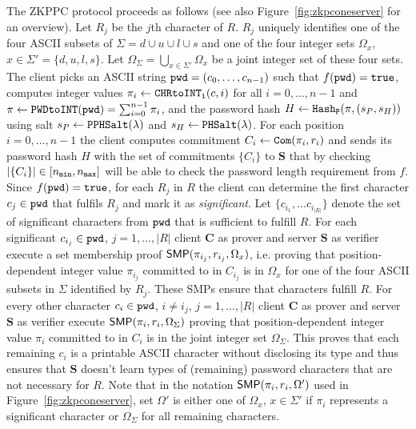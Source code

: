 The ZKPPC protocol proceeds as follows (see also Figure~\ref{fig:zkpconeserver} for an overview). Let $R_j$ be the $j$th character of $R$. $R_j$ uniquely identifies one of the four ASCII subsets of $\Sigma = d \cup u \cup l \cup s$ and one of the four integer sets $\Omega_x$, $x\in\Sigma'=\{d, u, l, s\}$. Let $\Omega_\Sigma=\bigcup_{x\in\Sigma'}\Omega_x$ be a joint integer set of these four sets. The client picks an ASCII string $\mathtt{pwd}=(c_0,\ldots,c_{n-1})$ such that $f(\mathtt{pwd})=\mathtt{true}$, computes integer values $\pi_i\gets\texttt{CHRtoINT}_\texttt{i}(c, i)$ for all $i= 0,\ldots, n-1$ and $\pi \gets \texttt{PWDtoINT}(\mathtt{pwd}) = \sum_{i=0}^{n-1}\pi_i$, and the password hash $H\gets \mathtt{Hash_P}(\pi, (s_P, s_H))$ using salt $s_P\gets\mathtt{PPHSalt}(\lambda)$ and $s_H\gets\mathtt{PHSalt}(\lambda)$. For each position $i=0,\ldots,n-1$ the client computes commitment $C_i \gets \mathtt{Com}(\pi_i, r_i)$ and sends its password hash $H$ with the set of commitments $\{C_i\}$ to $\bm{S}$ that by checking $|\{C_i\}|\in[{n_\mathtt{min}},{n_\mathtt{max}}]$ will be able to check the password length requirement from $f$. Since $f(\mathtt{pwd})=\mathtt{true}$, for each $R_j$ in $R$ the client can determine the first character $c_j\in\mathtt{pwd}$ that fulfils $R_j$ and mark it as \emph{significant}. Let $\{c_{i_1},\ldots c_{i_{|R|}}\}$ denote the set of significant characters from $\mathtt{pwd}$ that is sufficient to fulfill $R$. For each significant $c_{i_j}\in\mathtt{pwd}$, $j=1,\ldots, |R|$ client $\bm{C}$ as prover and server $\bm{S}$ as verifier execute a set membership proof $\mathsf{SMP}(\pi_{i_j},r_{i_j},\Omega_x)$, i.e. proving that position-dependent integer value $\pi_{i_j}$ committed to in $C_{i_j}$ is in $\Omega_x$ for one of the four ASCII subsets in $\Sigma$ identified by $R_j$. These SMPs ensure that characters fulfill $R$. For every other character $c_i\in\mathtt{pwd}$, $i\neq i_j$, $j=1,\ldots, |R|$ client $\bm{C}$ as prover and server $\bm{S}$ as verifier execute $\mathsf{SMP}(\pi_{i},r_{i},\Omega_\Sigma)$ proving that position-dependent integer value $\pi_{i}$ committed to in $C_{i}$ is in the joint integer set $\Omega_{\Sigma}$. This proves that each remaining $c_i$ is a printable ASCII character without disclosing its type and thus ensures that $\bm{S}$ doesn't learn types of (remaining) password characters that are not necessary for $R$. Note that in the notation $\mathsf{SMP}(\pi_i,r_i,\Omega')$ used in Figure~\ref{fig:zkpconeserver}, set $\Omega'$ is either one of $\Omega_x$, $x\in\Sigma'$ if $\pi_i$ represents a significant character or $\Omega_\Sigma$ for all remaining characters.

